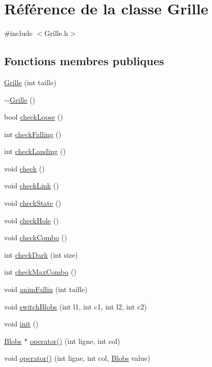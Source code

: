 \hypertarget{a00009}{
\section{Référence de la classe Grille}
\label{a00009}
}


{\ttfamily \#include $<$Grille.h$>$}

\subsection*{Fonctions membres publiques}
\begin{DoxyCompactItemize}
\item 
\hyperlink{a00009_a81670107c4d72721fe21ca966031bb38}{Grille} (int taille)
\item 
\hyperlink{a00009_ac9f539f33c2652c09f0f9db1adfa758d}{$\sim$Grille} ()
\item 
bool \hyperlink{a00009_a675db2a23a1a2a55668e823adca5a9ef}{checkLoose} ()
\item 
int \hyperlink{a00009_a858572a13fbc8917cec074554ca574d4}{checkFalling} ()
\item 
int \hyperlink{a00009_ae85e20bc3da47e38fff29e6e2f9ac6c0}{checkLanding} ()
\item 
void \hyperlink{a00009_adbbe24c84a3433c3968f18792de5aab7}{check} ()
\item 
void \hyperlink{a00009_acae31a9e26671f326ee60e11424f4545}{checkLink} ()
\item 
void \hyperlink{a00009_ab8bd46d3f97f1849662fe2642f270846}{checkState} ()
\item 
void \hyperlink{a00009_a9921270522f16053aa254abb2cab22de}{checkHole} ()
\item 
void \hyperlink{a00009_a4b142af28f88e73e0985c32a03472caf}{checkCombo} ()
\item 
int \hyperlink{a00009_a70e60f93d2b0ff9d37fd0e3967b3d454}{checkDark} (int size)
\item 
int \hyperlink{a00009_a0aa8c02a0ebdb2e0bd45bc29311a5693}{checkMaxCombo} ()
\item 
void \hyperlink{a00009_acdddbfa2d76354f294bc017196c5bc16}{animFallin} (int taille)
\item 
void \hyperlink{a00009_af24ae497afd4dc1657587803fb45fe1f}{switchBlobs} (int l1, int c1, int l2, int c2)
\item 
void \hyperlink{a00009_aa178d44adfb7047a30ecee5e21857bba}{init} ()
\item 
\hyperlink{a00002}{Blobs} $\ast$ \hyperlink{a00009_a7ebbc3349442e0cf860bb7000a81f742}{operator()} (int ligne, int col)
\item 
void \hyperlink{a00009_a3c0262b7d0b65a16c5ee573bd5adf542}{operator()} (int ligne, int col, \hyperlink{a00002}{Blobs} value)
\end{DoxyCompactItemize}
